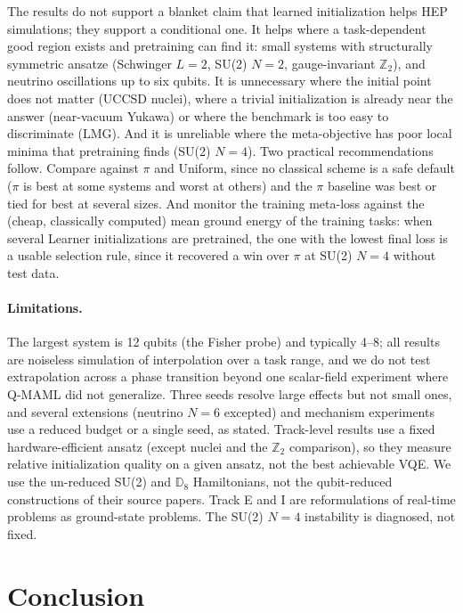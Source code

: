 \documentclass[pdflatex,sn-mathphys-num]{sn-jnl}
\begin{document}
The results do not support a blanket claim that learned initialization helps HEP simulations; they support a conditional one. It helps where a task-dependent good region exists and pretraining can find it: small systems with structurally symmetric ansatze (Schwinger $L{=}2$, SU(2) $N{=}2$, gauge-invariant $\mathbb{Z}_2$), and neutrino oscillations up to six qubits. It is unnecessary where the initial point does not matter (UCCSD nuclei), where a trivial initialization is already near the answer (near-vacuum Yukawa) or where the benchmark is too easy to discriminate (LMG). And it is unreliable where the meta-objective has poor local minima that pretraining finds (SU(2) $N{=}4$). Two practical recommendations follow. Compare against $\pi$ and Uniform, since no classical scheme is a safe default ($\pi$ is best at some systems and worst at others) and the $\pi$ baseline was best or tied for best at several sizes. And monitor the training meta-loss against the (cheap, classically computed) mean ground energy of the training tasks: when several Learner initializations are pretrained, the one with the lowest final loss is a usable selection rule, since it recovered a win over $\pi$ at SU(2) $N{=}4$ without test data.

\paragraph{Limitations.} The largest system is 12 qubits (the Fisher probe) and typically 4--8; all results are noiseless simulation of interpolation over a task range, and we do not test extrapolation across a phase transition beyond one scalar-field experiment where Q-MAML did not generalize. Three seeds resolve large effects but not small ones, and several extensions (neutrino $N{=}6$ excepted) and mechanism experiments use a reduced budget or a single seed, as stated. Track-level results use a fixed hardware-efficient ansatz (except nuclei and the $\mathbb{Z}_2$ comparison), so they measure relative initialization quality on a given ansatz, not the best achievable VQE. We use the un-reduced SU(2) and $\mathbb{D}_8$ Hamiltonians, not the qubit-reduced constructions of their source papers. Track E and I are reformulations of real-time problems as ground-state problems. The SU(2) $N{=}4$ instability is diagnosed, not fixed.

\section{Conclusion}\label{sec:conclusion}
\end{document}
